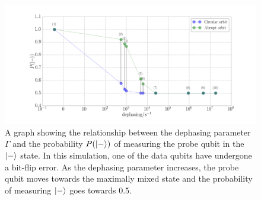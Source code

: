 \begin{figure}[h]
	\centering
	\includegraphics[width=\textwidth]{../Figures/dephasing_plot.png}
		\caption{A graph showing the relationship between the dephasing parameter $\Gamma$ and the probability $P(\ket{-})$ of measuring the probe qubit in the $\ket{-}$ state. In this simulation, one of the data qubits have undergone a bit-flip error. As the dephasing parameter increases, the probe qubit moves towards the maximally mixed state and the probability of measuring $\ket{-}$ goes towards 0.5.}
		\label{fig:phaseplot}
\end{figure}





